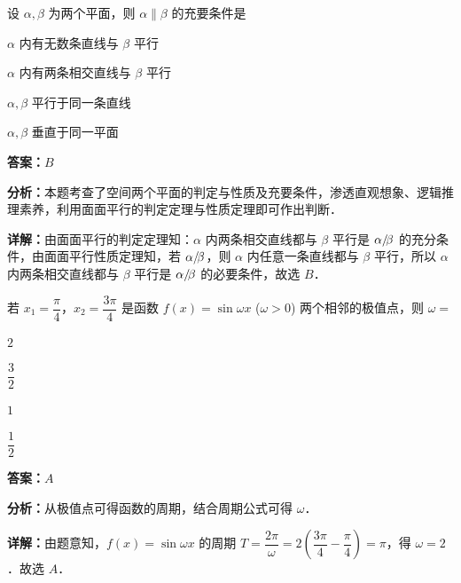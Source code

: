 \begin{question}[points=5]
设 $\alpha,\beta$ 为两个平面，则 $\alpha\parallel\beta$ 的充要条件是
\begin{choices}
  \item $\alpha$ 内有无数条直线与 $\beta$ 平行
  \item $\alpha$ 内有两条相交直线与 $\beta$ 平行
  \item $\alpha,\beta$ 平行于同一条直线
  \item $\alpha,\beta$ 垂直于同一平面
\end{choices}
\begin{solution}
\textbf{答案：}$B$

\textbf{分析：}本题考查了空间两个平面的判定与性质及充要条件，渗透直观想象、逻辑推理素养，利用面面平行的判定定理与性质定理即可作出判断．

\textbf{详解：}由面面平行的判定定理知：$\alpha$ 内两条相交直线都与 $\beta$ 平行是 $\alpha/\!\/\beta$ 的充分条件，由面面平行性质定理知，若 $\alpha/\!\/\beta$，则 $\alpha$ 内任意一条直线都与 $\beta$ 平行，所以 $\alpha$ 内两条相交直线都与 $\beta$ 平行是 $\alpha/\!\/\beta$ 的必要条件，故选 $B$．
\end{solution}
\end{question}

\begin{question}[points=5]
若 $x_1=\dfrac{\pi}{4}$，$x_2=\dfrac{3\pi}{4}$ 是函数 $f(x)=\sin\omega x$ ($\omega>0$) 两个相邻的极值点，则 $\omega=$
\begin{choices}
  \item $2$
  \item $\dfrac{3}{2}$
  \item $1$
  \item $\dfrac{1}{2}$
\end{choices}
\begin{solution}
\textbf{答案：}$A$

\textbf{分析：}从极值点可得函数的周期，结合周期公式可得 $\omega$．

\textbf{详解：}由题意知，$f(x)=\sin\omega x$ 的周期 $T=\dfrac{2\pi}{\omega}=2\left(\dfrac{3\pi}{4}-\dfrac{\pi}{4}\right)=\pi$，得 $\omega=2$．故选 $A$．
\end{solution}
\end{question}

